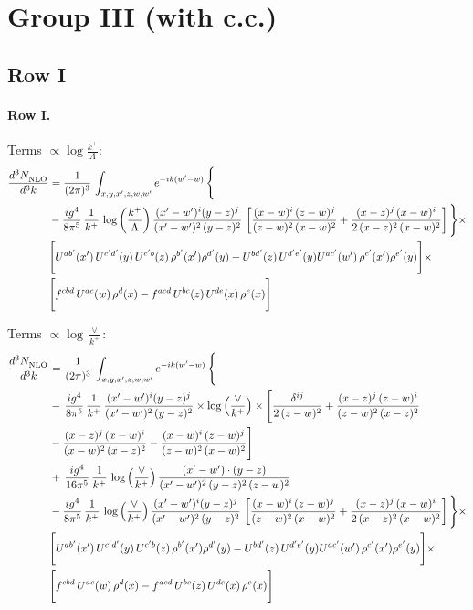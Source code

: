 \documentclass[10pt]{article}
\numberwithin{equation}{section}
\begin{document}
\section{Group III (with c.c.)}\label{sec:LLgIII}
\subsection{Row I}
\paragraph{Row I.}
\noindent Terms $\propto\log\frac{k^+}{\Lambda}$:
\begin{align}
     \frac{d^{3}N_{\rm NLO}^{\rm}}{d^{3}k}  & =   \frac{1}{(2\pi)^{3}}\, \int_{x,y,x',z,w,w^{\prime}} e^{-ik(w^{\prime}-w)}\, \Bigg\{\notag \\
& -\frac{ig^{4}}{8\pi^{5}}\,\frac{1}{k^{+}}\,\log{\left(\frac{k^{+}}{\Lambda}\right)}\,\frac{(x'-w')^{i}(y-z)^{j}}{(x'-w')^{2}\,(y-z)^{2}}\,\left[\frac{(x-w)^{i}\,(z-w)^{j}}{(z-w)^{2}\,(x-w)^{2}}+\frac{(x-z)^{j}\,(x-w)^{i}}{2\,(x-z)^{2}\, (x-w)^{2}}\right]\Bigg\}\times \notag \\ &  \Bigg[U^{ab'}(x')\,U^{c'd'}(y)\,U^{c'b}(z)\,\rho^{b'}(x')\rho^{d'}(y)-U^{bd'}(z)\,U^{d'e'}(y)U^{ac'}(w')\,\rho^{c'}(x')\rho^{e'}(y)\Bigg]\times\notag \\ & \Bigg[f^{cbd}\,U^{ac}(w)\,\rho^{d}(x)-f^{acd}\, U^{bc}(z)\,U^{de}(x)\,\rho^{e}(x)\Bigg] \label{eq:J:G3I}
\end{align}

\noindent Terms $\propto\log\frac{\vee}{k^+}$:
\begin{align}
     \frac{d^{3}N_{\rm NLO}^{\rm}}{d^{3}k}  & =   \frac{1}{(2\pi)^{3}}\, \int_{x,y,x',z,w,w^{\prime}} e^{-ik(w^{\prime}-w)}\, \Bigg\{\notag \\
& -\,\frac{ig^{4}}{8\pi^{5}}\,\frac{1}{k^{+}}\,\frac{(x'-w')^{i}(y-z)^{j}}{(x'-w')^{2}\,(y-z)^{2}}\times \log{\left(\frac{\vee}{k^{+}}\right)}\times \Bigg[\frac{\delta^{ij}}{2\,(z-w)^{2}}+\frac{(x-z)^{j}\,(z-w)^{i}}{(z-w)^{2}\,(x-z)^{2}}\notag \\ & -\frac{(x-z)^{j}\,(x-w)^{i}}{(x-w)^{2}\,(x-z)^{2}}-\frac{(x-w)^{i}\,(z-w)^{j}}{(z-w)^{2}\,(x-w)^{2}}\Bigg] \notag \\
& +\,\frac{ig^{4}}{16\pi^{5}}\,\frac{1}{k^{+}}\,\log{\left(\frac{\vee}{k^{+}}\right)}\, \frac{(x'-w')\cdot (y-z)}{(x'-w')^{2}\,(y-z)^{2}\,(z-w)^{2}} \notag \\
& -\frac{ig^{4}}{8\pi^{5}}\,\frac{1}{k^{+}}\,\log{\left(\frac{\vee}{k^{+}}\right)}\,\frac{(x'-w')^{i}(y-z)^{j}}{(x'-w')^{2}\,(y-z)^{2}}\,\left[\frac{(x-w)^{i}\,(z-w)^{j}}{(z-w)^{2}\,(x-w)^{2}}+\frac{(x-z)^{j}\,(x-w)^{i}}{2\,(x-z)^{2}\, (x-w)^{2}}\right]\Bigg\}\times \notag \\ &  \Bigg[U^{ab'}(x')\,U^{c'd'}(y)\,U^{c'b}(z)\,\rho^{b'}(x')\rho^{d'}(y)-U^{bd'}(z)\,U^{d'e'}(y)U^{ac'}(w')\,\rho^{c'}(x')\rho^{e'}(y)\Bigg]\times\notag \\ & \Bigg[f^{cbd}\,U^{ac}(w)\,\rho^{d}(x)-f^{acd}\, U^{bc}(z)\,U^{de}(x)\,\rho^{e}(x)\Bigg] \label{eq:B:G3I}
\end{align}
\end{document}

